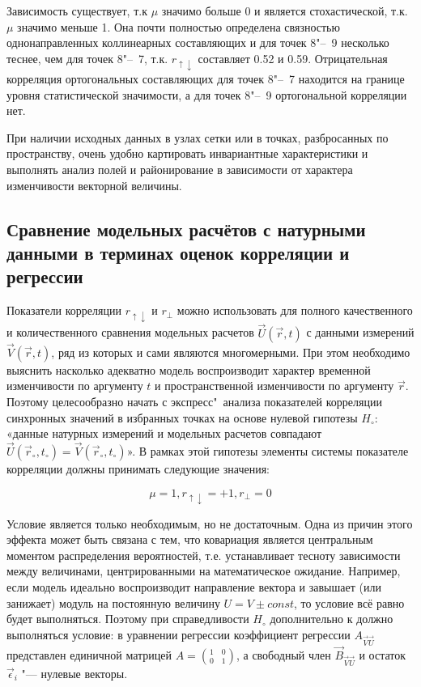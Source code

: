 
Зависимость существует, т.к $\mu$ значимо больше 0 и является стохастической, т.к. $\mu$ значимо меньше 1. Она почти полностью определена связностью однонаправленных коллинеарных составляющих и для точек 8"--~9 несколько теснее, чем для точек 8"--~7, т.к. $r_{\uparrow\downarrow}$ составляет 0.52 и 0.59. Отрицательная корреляция ортогональных составляющих для точек 8"--~7 находится на границе уровня статистической значимости, а для точек 8"--~9 ортогональной корреляции нет.

При наличии исходных данных в узлах сетки или в точках, разбросанных по пространству, очень удобно картировать инвариантные характеристики и выполнять анализ полей и районирование в зависимости от характера изменчивости векторной величины.

\subsection{Сравнение модельных расчётов с натурными данными в терминах оценок корреляции и регрессии}
Показатели корреляции $r_{\uparrow\downarrow}$ и $r_{\perp}$ можно использовать для полного качественного и количественного сравнения модельных расчетов $\vec{U}(\vec{r},t)$ с данными измерений $\vec{V}(\vec{r},t)$, ряд из которых и сами являются многомерными. При этом необходимо выяснить насколько адекватно модель воспроизводит характер временной изменчивости по аргументу $t$ и пространственной изменчивости по аргументу $\vec{r}$. Поэтому целесообразно начать с экспресс"~анализа показателей корреляции синхронных значений в избранных точках на основе нулевой гипотезы $H_{\circ}$: «данные натурных измерений и модельных расчетов совпадают $\vec{U}(\vec{r}_{\circ},t_{\circ})=\vec{V}(\vec{r}_{\circ},t_{\circ})$». В рамках этой гипотезы элементы системы показателе корреляции   должны принимать следующие значения:

\begin{equation}
\label{eq:equation3_26}
{\mu=1, r_{\uparrow\downarrow}=+1, r_{\perp}=0}
\end{equation}  

Условие  является только необходимым, но не достаточным. Одна из причин этого эффекта может быть связана с тем, что ковариация является центральным моментом распределения вероятностей, т.е. устанавливает тесноту зависимости между величинами, центрированными на математическое ожидание. Например, если модель идеально воспроизводит направление вектора  и завышает (или занижает) модуль на постоянную величину $U=V\pm{const}$, то условие  всё равно будет выполняться. Поэтому при справедливости $H_{\circ}$ дополнительно к  должно выполняться условие: в уравнении регрессии  коэффициент регрессии $A_{\vec{V}\vec{U}}$ представлен единичной матрицей $A={{1}\quad {0}\choose {0}\quad {1}}$, а свободный член $\vec{B}_{\vec{V}\vec{U}}$ и остаток $\vec{\epsilon}_{i}$ "--- нулевые векторы.

